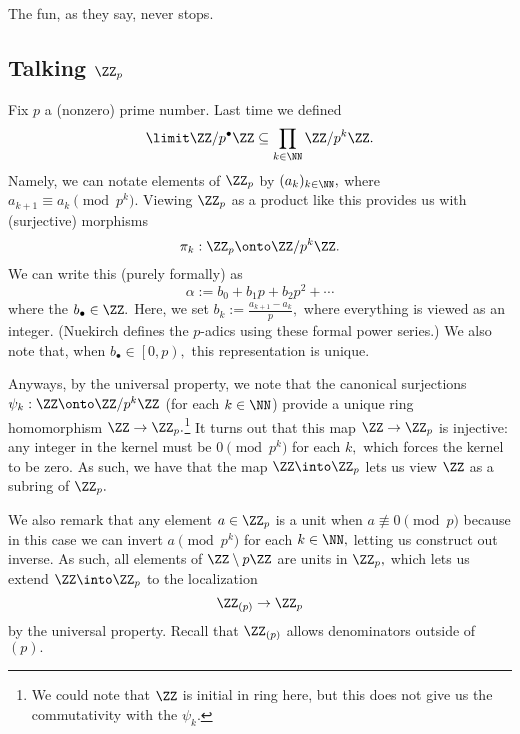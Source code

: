 















The fun, as they say, never stops.

\subsection{Talking \texorpdfstring{$\ZZ_p$}{}}
Fix $p$ a (nonzero) prime number. Last time we defined
\[\limit\ZZ/p^\bullet\ZZ\subseteq\prod_{k\in\NN}\ZZ/p^k\ZZ.\]
Namely, we can notate elements of $\ZZ_p$ by $(a_k)_{k\in\NN},$ where $a_{k+1}\equiv a_k\pmod{p^k}.$ Viewing $\ZZ_p$ as a product like this provides us with (surjective) morphisms
\[\pi_k:\ZZ_p\onto\ZZ/p^k\ZZ.\]
We can write this (purely formally) as
\[\alpha:=b_0+b_1p+b_2p^2+\cdots\]
where the $b_\bullet\in\ZZ.$ Here, we set $b_k:=\frac{a_{k+1}-a_k}p,$ where everything is viewed as an integer. (Nuekirch defines the $p$-adics using these formal power series.) We also note that, when $b_\bullet\in\left[0,p\right),$ this representation is unique.

Anyways, by the universal property, we note that the canonical surjections $\psi_k:\ZZ\onto\ZZ/p^k\ZZ$ (for each $k\in\NN$) provide a unique ring homomorphism $\ZZ\to\ZZ_p.$\footnote{We could note that $\ZZ$ is initial in ring here, but this does not give us the commutativity with the $\psi_k.$} It turns out that this map $\ZZ\to\ZZ_p$ is injective: any integer in the kernel must be $0\pmod{p^k}$ for each $k,$ which forces the kernel to be zero. As such, we have that the map $\ZZ\into\ZZ_p$ lets us view $\ZZ$ as a subring of $\ZZ_p.$

We also remark that any element $a\in\ZZ_p$ is a unit when $a\not\equiv0\pmod p$ because in this case we can invert $a\pmod{p^k}$ for each $k\in\NN,$ letting us construct out inverse. As such, all elements of $\ZZ\setminus p\ZZ$ are units in $\ZZ_p,$ which lets us extend $\ZZ\into\ZZ_p$ to the localization
\[\ZZ_{(p)}\to\ZZ_p\]
by the universal property. Recall that $\ZZ_{(p)}$ allows denominators outside of $(p).$

